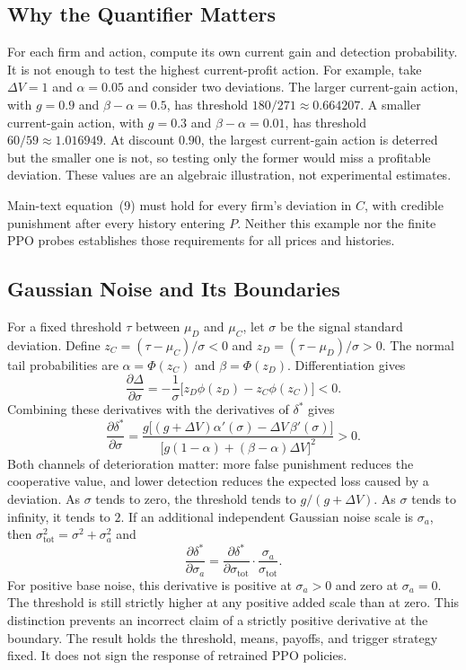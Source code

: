 \documentclass{article}
\begin{document}
\subsection{Why the Quantifier Matters}

For each firm and action, compute its own current gain and detection probability. It is not enough to test the highest current-profit action. For example, take $\Delta V = 1$ and $\alpha = 0.05$ and consider two deviations. The larger current-gain action, with $g = 0.9$ and $\beta - \alpha = 0.5$, has threshold $180/271 \approx 0.664207$. A smaller current-gain action, with $g = 0.3$ and $\beta - \alpha = 0.01$, has threshold $60/59 \approx 1.016949$. At discount $0.90$, the largest current-gain action is deterred but the smaller one is not, so testing only the former would miss a profitable deviation. These values are an algebraic illustration, not experimental estimates.

Main-text equation~(9) must hold for every firm's deviation in $C$, with credible punishment after every history entering $P$. Neither this example nor the finite PPO probes establishes those requirements for all prices and histories.

\subsection{Gaussian Noise and Its Boundaries}

For a fixed threshold $\tau$ between $\mu_D$ and $\mu_C$, let $\sigma$ be the signal standard deviation. Define $z_C = (\tau - \mu_C)/\sigma < 0$ and $z_D = (\tau - \mu_D)/\sigma > 0$. The normal tail probabilities are $\alpha = \Phi(z_C)$ and $\beta = \Phi(z_D)$. Differentiation gives
\[
\frac{\partial \Delta}{\partial \sigma} = -\frac{1}{\sigma}\bigl[z_D \phi(z_D) - z_C \phi(z_C)\bigr] < 0.
\]
Combining these derivatives with the derivatives of $\delta^*$ gives
\[
\frac{\partial \delta^*}{\partial \sigma} = \frac{g\bigl[(g + \Delta V)\alpha'(\sigma) - \Delta V\,\beta'(\sigma)\bigr]}{\bigl[g(1-\alpha) + (\beta-\alpha)\Delta V\bigr]^2} > 0.
\]
Both channels of deterioration matter: more false punishment reduces the cooperative value, and lower detection reduces the expected loss caused by a deviation. As $\sigma$ tends to zero, the threshold tends to $g/(g + \Delta V)$. As $\sigma$ tends to infinity, it tends to $2$. If an additional independent Gaussian noise scale is $\sigma_a$, then $\sigma_{\mathrm{tot}}^2 = \sigma^2 + \sigma_a^2$ and
\[
\frac{\partial \delta^*}{\partial \sigma_a} = \frac{\partial \delta^*}{\partial \sigma_{\mathrm{tot}}} \cdot \frac{\sigma_a}{\sigma_{\mathrm{tot}}}.
\]
For positive base noise, this derivative is positive at $\sigma_a > 0$ and zero at $\sigma_a = 0$. The threshold is still strictly higher at any positive added scale than at zero. This distinction prevents an incorrect claim of a strictly positive derivative at the boundary. The result holds the threshold, means, payoffs, and trigger strategy fixed. It does not sign the response of retrained PPO policies.
\end{document}
